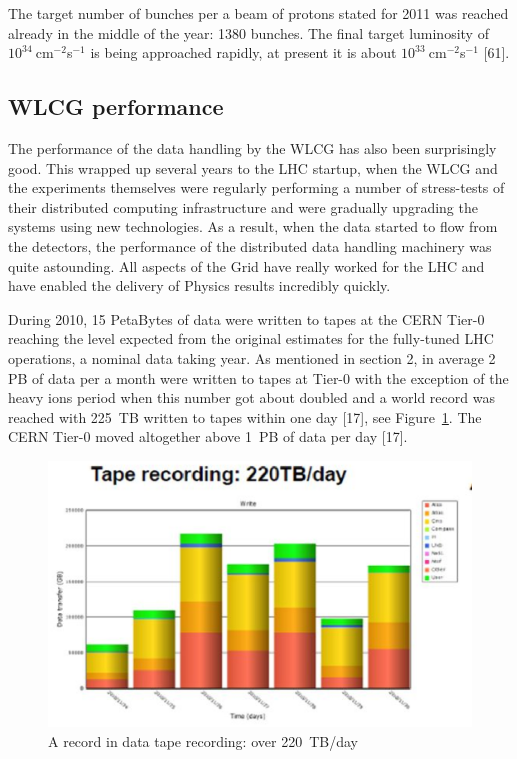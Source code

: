 \documentclass{intech}
\begin{document}
The target number of bunches per a beam of protons stated for 2011
was reached already in the middle of the year: 1380 bunches. The
final target luminosity of $10^{34}\ $cm${}^{-2}$s${}^{-1}$ is being
approached rapidly, at present it is about
$10^{33}\ $cm${}^{-2}$s${}^{-1}$ [61].


\subsection{WLCG performance}
%
The performance of the data handling by the WLCG has also been
surprisingly good. This wrapped up several years to the LHC startup,
when the WLCG and the experiments themselves were regularly
performing a number of stress-tests of their distributed computing
infrastructure and were gradually upgrading the systems using new
technologies. As a result, when the data started to flow from the
detectors, the performance of the distributed data handling
machinery was quite astounding.  All aspects of the Grid have really
worked for the LHC and have enabled the delivery of Physics results
incredibly quickly.

During 2010, 15 PetaBytes of data were written to tapes at the CERN
Tier-0 reaching the level expected from the original estimates for
the fully-tuned LHC operations, a nominal data taking year. As
mentioned in section 2, in average 2 PB of data per a month were
written to tapes at Tier-0 with the exception of the heavy ions
period when this number got about doubled and a world record was
reached with 225~TB written to tapes within one day [17], see
Figure~\ref{fig18}. The CERN Tier-0 moved altogether above 1~PB of
data per day [17].

\begin{figure}[htb] %
\centering
\includegraphics[width=13cm]{fig18.eps} %
\caption{A record in data tape recording: over
220~TB/day}\label{fig18}
\end{figure}
\end{document}
